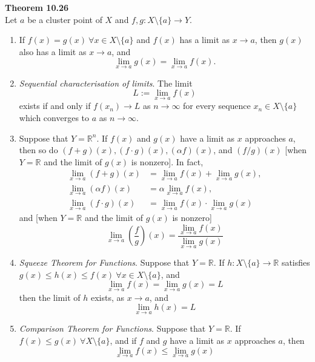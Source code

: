 \documentclass[8pt,landscape]{article}
\begin{document}
\begin{multicols}{3}
\textbf{Theorem 10.26} \\
Let $a$ be a cluster point of $X$ and $f, g : X \setminus \{a\} \to Y$.
\begin{enumerate}
    \item If $f(x) = g(x) \ \forall x \in X \setminus \{a\}$ and $f(x)$ has a limit
        as $x \to a$, then $g(x)$ also has a limit as $x \to a$, and
        \[
            \lim_{x \to a} g(x) = \lim_{x \to a} f(x).
        \]
    \item \emph{Sequential characterisation of limits}.
        The limit
        \[
            L := \lim_{x \to a} f(x)
        \]
        exists if and only if $f(x_n) \to L$ as $n \to \infty$ for every sequence
        $x_n \in X \setminus \{a\}$ which converges to $a$ as $n \to \infty$.
    \item Suppose that $Y = \mathbb{R}^n$.
        If $f(x)$ and $g(x)$ have a limit as $x$ approaches $a$, then so do
        $(f+g)(x), (f \cdot g)(x), (\alpha f)(x)$, and $(f/g)(x)$
        [when $Y = \mathbb{R}$ and the limit of $g(x)$ is nonzero].
        In fact,
        \begin{align*}
            \lim_{x \to a} (f+g)(x) &= \lim_{x \to a} f(x) + \lim_{x \to a} g(x), \\
            \lim_{x \to a} (\alpha f) (x) &= \alpha \lim_{x \to a} f(x), \\
            \lim_{x \to a} (f \cdot g) (x) &= \lim_{x \to a} f(x) \cdot \lim_{x \to a} g(x)
        \end{align*}
        and [when $Y = \mathbb{R}$ and the limit of $g(x)$ is nonzero]
        \[
            \lim_{x \to a} \left( \frac{f}{g} \right) (x) =
            \frac{\lim_{x \to a} f(x)}{\lim_{x \to a} g(x)}
        \]
    \item \emph{Squeeze Theorem for Functions}.
        Suppose that $Y = \mathbb{R}$.
        If $h : X \setminus \{a\} \to \mathbb{R}$ satisfies
        $g(x) \leq h(x) \leq f(x) \ \forall x \in X \setminus \{a\}$, and
        \[
            \lim_{x \to a} f(x) = \lim_{x \to a} g(x) = L
        \]
        then the limit of $h$ exists, as $x \to a$, and
        \[
            \lim_{x \to a} h(x) = L
        \]
    \item \emph{Comparison Theorem for Functions}.
        Suppose that $Y = \mathbb{R}$.
        If $f(x) \leq g(x) \ \forall X \setminus \{a\}$, and if $f$ and $g$ have
        a limit as $x$ approaches $a$, then
        \[
            \lim_{x \to a} f(x) \leq \lim_{x \to a} g(x)
        \]


\end{enumerate}
\end{multicols}
\end{document}
